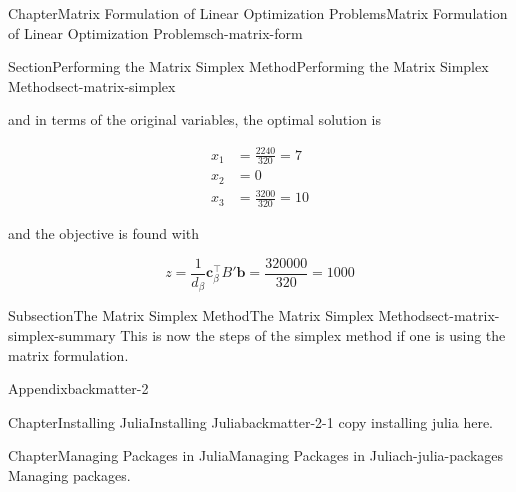 \documentclass[oneside,10pt,]{book}
\numberwithin{equation}{section}
\providecommand\phantomsection{}
\newcommand{\amp}{&}
\begin{document}
\begin{chapterptx}{Chapter}{Matrix Formulation of Linear Optimization Problems}{}{Matrix Formulation of Linear Optimization Problems}{}{}{ch-matrix-form}
\begin{sectionptx}{Section}{Performing the Matrix Simplex Method}{}{Performing the Matrix Simplex Method}{}{}{sect-matrix-simplex}
\begin{introduction}{}
\begin{enumerate}
and in terms of the original variables, the optimal solution is%
\par
%
\begin{equation*}
\begin{aligned} x_1 \amp = \frac{2240}{320} = 7 \\ x_2 \amp = 0 \\ x_3 \amp = \frac{3200}{320} = 10 \end{aligned}
\end{equation*}
%
\par
and the objective is found with%
\par
%
\begin{equation*}
z = \frac{1}{d_{\beta}} \boldsymbol{c}^{\intercal}_{\beta} B' \boldsymbol{b} = \frac{320000}{320} = 1000
\end{equation*}
%
\end{enumerate}
%
\end{introduction}%
%
%
\typeout{************************************************}
\typeout{************************************************}
%
\begin{subsectionptx}{Subsection}{The Matrix Simplex Method}{}{The Matrix Simplex Method}{}{}{sect-matrix-simplex-summary}
This is now the steps of the simplex method if one is using the matrix formulation.%
\end{subsectionptx}
\end{sectionptx}
\end{chapterptx}
%
\appendix%
%
\clearpage\phantomsection%
%
%
%
\typeout{************************************************}
\typeout{************************************************}
%
\begin{appendixptx}{Appendix}{}{}{}{}{}{backmatter-2}
\renewcommand*{\appendixname}{Appendix}
%
%
\typeout{************************************************}
\typeout{************************************************}
%
\begin{chapterptx}{Chapter}{Installing Julia}{}{Installing Julia}{}{}{backmatter-2-1}
\renewcommand*{\chaptername}{Chapter}
copy installing julia here.%
\end{chapterptx}
%
%
\typeout{************************************************}
\typeout{************************************************}
%
\begin{chapterptx}{Chapter}{Managing Packages in Julia}{}{Managing Packages in Julia}{}{}{ch-julia-packages}
\renewcommand*{\chaptername}{Chapter}
Managing packages.%
\end{chapterptx}
\end{appendixptx}
\end{document}
